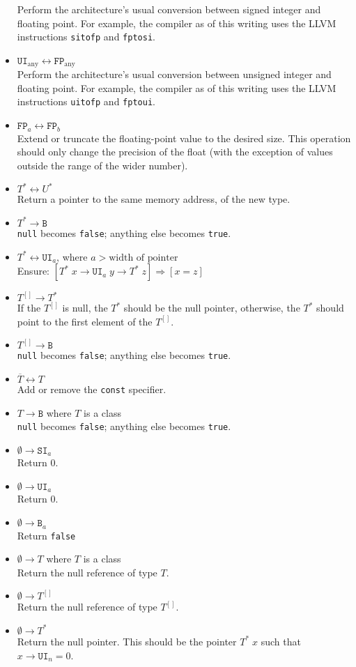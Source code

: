 \documentclass{article}
\newcommand{\R}[1]{\mathtt{#1}}
\newcommand{\both}{\leftrightarrow}
\begin{document}
\begin{itemize}
{    Perform the architecture's usual conversion between signed integer and
    floating point. For example, the compiler as of this writing uses the
    LLVM instructions \texttt{sitofp} and \texttt{fptosi}.}
  \item{$\R{UI}_\mathrm{any} \both \R{FP}_\mathrm{any}$ \\
    Perform the architecture's usual conversion between unsigned integer and
    floating point. For example, the compiler as of this writing uses the
    LLVM instructions \texttt{uitofp} and \texttt{fptoui}.}
  \item{$\R{FP}_a \both \R{FP}_b$ \\
    Extend or truncate the floating-point value to the desired size. This
    operation should only change the precision of the float (with the exception
    of values outside the range of the wider number).}
  \item{$T^* \both U^*$ \\
    Return a pointer to the same memory address, of the new type.}
  \item{$T^* \to \R{B}$ \\
    \texttt{null} becomes \texttt{false}; anything else becomes
    \texttt{true}.}
  \item{$T^* \both \R{UI}_a$, where $a > \textrm{width of pointer}$ \\
    Ensure: $[T^*\;x \to \R{UI}_a\;y \to T^*\;z] \Rightarrow [x = z]$}
  \item{$T^{[]} \to T^*$ \\
    If the $T^{[]}$ is null, the $T^*$ should be the null pointer, otherwise,
    the $T^*$ should point to the first element of the $T^{[]}$.}
  \item{$T^{[]} \to \R{B}$ \\
    \texttt{null} becomes \texttt{false}; anything else becomes
    \texttt{true}.}
  \item{$\overline{T} \both T$ \\
    Add or remove the \texttt{const} specifier.}
  \item{$T \to \R{B}$ where $T$ is a class \\
    \texttt{null} becomes \texttt{false}; anything else becomes
    \texttt{true}.}
  \item{$\emptyset \to \R{SI}_a$ \\
    Return $0$.}
  \item{$\emptyset \to \R{UI}_a$ \\
    Return $0$.}
  \item{$\emptyset \to \R{B}_a$ \\
    Return \texttt{false}}
  \item{$\emptyset \to T$ where $T$ is a class \\
    Return the null reference of type $T$.}
  \item{$\emptyset \to T^{[]}$ \\
    Return the null reference of type $T^{[]}$.}
  \item{$\emptyset \to T^*$ \\
    Return the null pointer. This should be the pointer $T^*\;x$ such that
    $x \to \R{UI}_n = 0$.}
\end{itemize}
\end{document}
